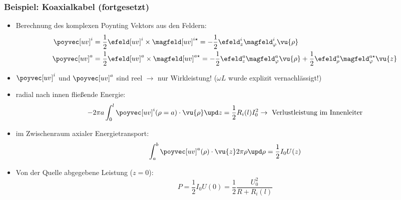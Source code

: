\begin{frame}
  \frametitle{Beispiel: Koaxialkabel (fortgesetzt)}
\begin{itemize}[<+->]
\item Berechnung des komplexen Poynting Vektors aus den Feldern:
  \begin{align*}
    \poyvec[uv]^i &= \frac{1}{2} \efeld[uv]^i \times \magfeld[uv]^{i\star} = -\frac{1}{2} \efeld_z^i \magfeld_\varphi^i \vu{\rho}\\
    \poyvec[uv]^a &=\frac{1}{2} \efeld[uv]^a \times \magfeld[uv]^{a\star} = -\frac{1}{2} \efeld_z^a \magfeld_\varphi^a \vu{\rho} + \frac{1}{2} \efeld_\rho^a \magfeld_\varphi^{a\star} \vu{z}
  \end{align*}
\item $\poyvec[uv]^i$ und $\poyvec[uv]^a$ sind reel $\to$ nur Wirkleistung! ($\omega L$ wurde explizit vernachlässigt!)
\item radial nach innen fließende Energie:
  $$
  - 2\pi a \int_0^l \poyvec[uv]^i (\rho=a)\cdot\vu{\rho} \upd z = \frac{1}{2} R_i(l) I_0^2 \to \text{ Verlustleistung im Innenleiter}
  $$
\item im Zwischenraum axialer Energietransport:
  $$
  \int_a^b \poyvec[uv]^a (\rho) \cdot\vu{z} 2 \pi\rho\upd\rho = \frac{1}{2} I_0 U(z) 
  $$
\item Von der Quelle abgegebene Leistung ($z=0$):
  $$
  P = \frac{1}{2} I_0U(0) = \frac{1}{2} \frac{U_0^2}{R+R_i(l)}
  $$
  \end{itemize}
\end{frame}




   
